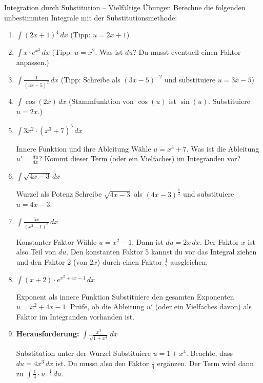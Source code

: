 \begin{aufgabenumgebung}{Integration durch Substitution – Vielfältige Übungen}
Berechne die folgenden unbestimmten Integrale mit der Substitutionsmethode:
\begin{enumerate}
    \item $\int (2x+1)^4 \,dx$ (Tipp: $u=2x+1$)
    \item $\int x \cdot e^{x^2} \,dx$ (Tipp: $u=x^2$. Was ist $du$? Du musst eventuell einen Faktor anpassen.)
    \item $\int \frac{1}{(3x-5)^2} \,dx$ (Tipp: Schreibe als $(3x-5)^{-2}$ und substituiere $u=3x-5$)
    \item $\int \cos(2x) \,dx$ (Stammfunktion von $\cos(u)$ ist $\sin(u)$. Substituiere $u=2x$.)
    \item $\int 3x^2 \cdot (x^3+7)^5 \,dx$ 
        \begin{tippumgebung}{Innere Funktion und ihre Ableitung}
        Wähle $u=x^3+7$. Was ist die Ableitung $u' = \frac{du}{dx}$? Kommt dieser Term (oder ein Vielfaches) im Integranden vor?
        \end{tippumgebung}
    \item $\int \sqrt{4x-3} \,dx$ 
        \begin{tippumgebung}{Wurzel als Potenz}
        Schreibe $\sqrt{4x-3}$ als $(4x-3)^{\frac{1}{2}}$ und substituiere $u=4x-3$.
        \end{tippumgebung}
    \item $\int \frac{5x}{(x^2-1)^3} \,dx$
        \begin{tippumgebung}{Konstanter Faktor}
        Wähle $u=x^2-1$. Dann ist $du = 2x \,dx$. Der Faktor $x$ ist also Teil von $du$. Den konstanten Faktor 5 kannst du vor das Integral ziehen und den Faktor 2 (von $2x$) durch einen Faktor $\frac{1}{2}$ ausgleichen.
        \end{tippumgebung}
    \item $\int (x+2) \cdot e^{x^2+4x-1} \,dx$
        \begin{tippumgebung}{Exponent als innere Funktion}
        Substituiere den gesamten Exponenten $u=x^2+4x-1$. Prüfe, ob die Ableitung $u'$ (oder ein Vielfaches davon) als Faktor im Integranden vorhanden ist.
        \end{tippumgebung}
    \item \textbf{Herausforderung:} $\int \frac{x^3}{\sqrt{1+x^4}} \,dx$
        \begin{tippumgebung}{Substitution unter der Wurzel}
        Substituiere $u=1+x^4$. Beachte, dass $du = 4x^3 \,dx$ ist. Du musst also den Faktor $\frac{1}{4}$ ergänzen. Der Term wird dann zu $\int \frac{1}{4} \cdot u^{-\frac{1}{2}} \,du$.
        \end{tippumgebung}
\end{enumerate}
\end{aufgabenumgebung}

